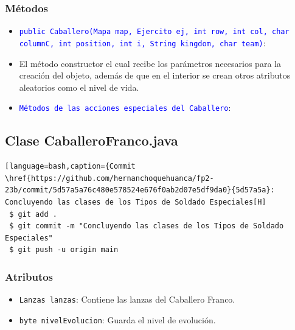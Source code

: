 \documentclass{article}
\begin{document}
\subsubsection{Métodos}
\begin{itemize}
    \item \texttt{\textcolor{blue}{public Caballero(Mapa map, Ejercito ej, int row, int col, char columnC, int position, int i, String kingdom, char team)}}: 
    \item El método constructor el cual recibe los parámetros necesarios para la creación del objeto, además de que en el interior se crean otros atributos aleatorios como el nivel de vida.
\end{itemize}


\newpage
\begin{itemize}
    \item \texttt{\textcolor{blue}{Métodos de las acciones especiales del Caballero}}: 
\end{itemize}



\newpage
\subsection{Clase CaballeroFranco.java}
\begin{lstlisting}[language=bash,caption={Commit \href{https://github.com/hernanchoquehuanca/fp2-23b/commit/5d57a5a76c480e578524e676f0ab2d07e5df9da0}{5d57a5a}: Concluyendo las clases de los Tipos de Soldado Especiales[H]
 $ git add .
 $ git commit -m "Concluyendo las clases de los Tipos de Soldado Especiales"			
 $ git push -u origin main
\end{lstlisting}

\subsubsection{Atributos}
\begin{itemize}
    \item \texttt{Lanzas lanzas}: Contiene las lanzas del Caballero Franco.
    \item \texttt{byte nivelEvolucion}: Guarda el nivel de evolución.
\end{itemize}

\end{document}
